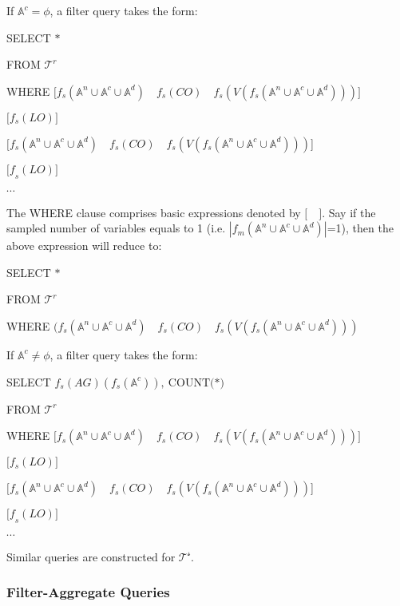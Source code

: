 If \(\mathbb{A}^{c} = \phi\), a filter query takes the form:

SELECT \(*\)

FROM \(\mathcal{T}^{r}\)

WHERE
\(\lbrack f_{s}(\mathbb{A}^{n} \cup \mathbb{A}^{c} \cup \mathbb{A}^{d})\quad f_{s}(CO)\quad f_{s}(V(f_{s}(\mathbb{A}^{n} \cup \mathbb{A}^{c} \cup \mathbb{A}^{d})))\rbrack\)

\(\lbrack f_{s}(LO)\rbrack\)

\(\lbrack f_{s}(\mathbb{A}^{n} \cup \mathbb{A}^{c} \cup \mathbb{A}^{d})\quad f_{s}(CO)\quad f_{s}(V(f_{s}(\mathbb{A}^{n} \cup \mathbb{A}^{c} \cup \mathbb{A}^{d})))\){]}

\({\lbrack f}_{s}(LO)\rbrack\)

\(\cdots\)

The WHERE clause comprises basic expressions denoted by
\(\lbrack\quad\rbrack\). Say if the sampled number of variables equals
to 1 (i.e.
\(|f_{m}(\mathbb{A}^{n} \cup \mathbb{A}^{c} \cup \mathbb{A}^{d})|\)=1),
then the above expression will reduce to:

SELECT \(*\)

FROM \(\mathcal{T}^{r}\)

WHERE
\((f_{s}(\mathbb{A}^{n} \cup \mathbb{A}^{c} \cup \mathbb{A}^{d})\quad f_{s}(CO)\quad f_{s}(V(f_{s}(\mathbb{A}^{n} \cup \mathbb{A}^{c} \cup \mathbb{A}^{d})))\)

If \(\mathbb{A}^{c} \neq \phi\), a filter query takes the form:

SELECT
\(f_{s}(AG)(f_{s}(\mathbb{A}^{c}))\mathrm{,\ }\mathrm{COUNT(}\mathrm{*)}\)

FROM \(\mathcal{T}^{r}\)

WHERE
\(\lbrack f_{s}(\mathbb{A}^{n} \cup \mathbb{A}^{c} \cup \mathbb{A}^{d})\quad f_{s}(CO)\quad f_{s}(V(f_{s}(\mathbb{A}^{n} \cup \mathbb{A}^{c} \cup \mathbb{A}^{d})))\rbrack\)

\(\lbrack f_{s}(LO)\rbrack\)

\(\lbrack f_{s}(\mathbb{A}^{n} \cup \mathbb{A}^{c} \cup \mathbb{A}^{d})\quad f_{s}(CO)\quad f_{s}(V(f_{s}(\mathbb{A}^{n} \cup \mathbb{A}^{c} \cup \mathbb{A}^{d})))\){]}

\({\lbrack f}_{s}(LO)\rbrack\)

\(\cdots\)

Similar queries are constructed for \(\mathcal{T}^{\mathcal{s}}\).

\hypertarget{filter-aggregate-queries}{%
\subsubsection{Filter-Aggregate
Queries}\label{filter-aggregate-queries}}

